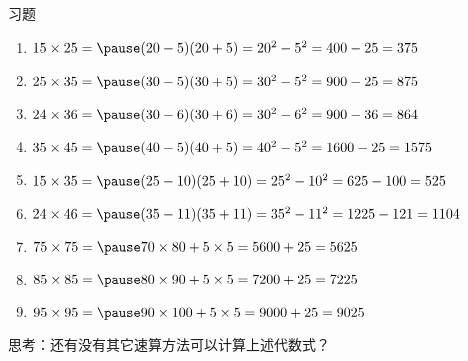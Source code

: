 \documentclass[aspectratio=169]{ctexbeamer} %
\begin{document}
\begin{frame}[t]{习题}
\begin{spacing}{1.2}
\normalsize
\begin{enumerate}[label={\arabic*.}]
\item $15 \times 25 = \pause (20-5)(20+5) = 20^2-5^2 = 400-25 = 375$
\item $25 \times 35 = \pause (30-5)(30+5) = 30^2-5^2 = 900-25 = 875$
\item $24 \times 36 = \pause (30-6)(30+6) = 30^2-6^2 = 900-36 = 864$
\item $35 \times 45 = \pause (40-5)(40+5) = 40^2-5^2 = 1600-25 = 1575$
\item $15 \times 35 = \pause (25-10)(25+10) = 25^2-10^2 = 625-100 = 525$
\item $24 \times 46 = \pause (35-11)(35+11) = 35^2-11^2 = 1225-121 = 1104$
\item $75 \times 75 = \pause 70 \times 80 + 5 \times 5 = 5600 + 25 = 5625$
\item $85 \times 85 = \pause 80 \times 90 + 5 \times 5 = 7200 + 25 = 7225$
\item $95 \times 95 = \pause 90 \times 100 + 5 \times 5 = 9000 + 25 = 9025$
\end{enumerate}
\alert{思考：还有没有其它速算方法可以计算上述代数式？}
\end{spacing}
\end{frame}
\end{document}
